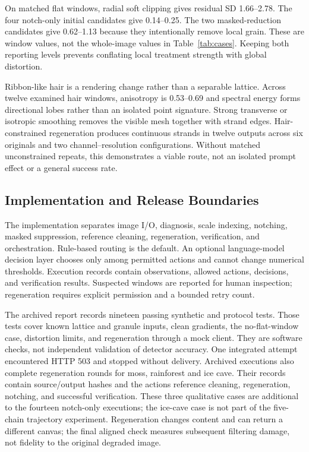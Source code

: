\documentclass[sigplan,10pt,nonacm]{acmart}
\begin{document}
On matched flat windows, radial soft clipping gives residual SD 1.66--2.78. The four notch-only initial candidates give 0.14--0.25. The two masked-reduction candidates give 0.62--1.13 because they intentionally remove local grain. These are window values, not the whole-image values in Table~\ref{tab:cases}. Keeping both reporting levels prevents conflating local treatment strength with global distortion.

Ribbon-like hair is a rendering change rather than a separable lattice. Across twelve examined hair windows, anisotropy is 0.53--0.69 and spectral energy forms directional lobes rather than an isolated point signature. Strong transverse or isotropic smoothing removes the visible mesh together with strand edges. Hair-constrained regeneration produces continuous strands in twelve outputs across six originals and two channel--resolution configurations. Without matched unconstrained repeats, this demonstrates a viable route, not an isolated prompt effect or a general success rate.

\subsection{Implementation and Release Boundaries}
The implementation separates image I/O, diagnosis, scale indexing, notching, masked suppression, reference cleaning, regeneration, verification, and orchestration. Rule-based routing is the default. An optional language-model decision layer chooses only among permitted actions and cannot change numerical thresholds. Execution records contain observations, allowed actions, decisions, and verification results. Suspected windows are reported for human inspection; regeneration requires explicit permission and a bounded retry count.

The archived report records nineteen passing synthetic and protocol tests. Those tests cover known lattice and granule inputs, clean gradients, the no-flat-window case, distortion limits, and regeneration through a mock client. They are software checks, not independent validation of detector accuracy. One integrated attempt encountered HTTP 503 and stopped without delivery. Archived executions also complete regeneration rounds for moss, rainforest and ice cave. Their records contain source/output hashes and the actions reference cleaning, regeneration, notching, and successful verification. These three qualitative cases are additional to the fourteen notch-only executions; the ice-cave case is not part of the five-chain trajectory experiment. Regeneration changes content and can return a different canvas; the final aligned check measures subsequent filtering damage, not fidelity to the original degraded image.
\end{document}
